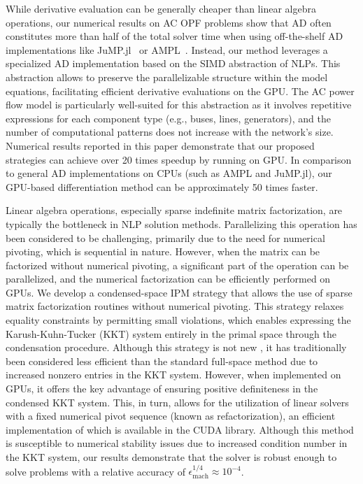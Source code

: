 While derivative evaluation can be generally cheaper than linear
algebra operations, our numerical results on AC OPF problems show that
AD often constitutes more than half of the total solver time when
using off-the-shelf AD implementations like
JuMP.jl~\cite{dunning2017jump} or
AMPL~\cite{fourer1990modeling}. Instead, our method leverages a
specialized AD implementation based on the SIMD abstraction of
NLPs. This abstraction allows to preserve the parallelizable structure
within the model equations, facilitating efficient derivative
evaluations on the GPU. The AC power flow model is particularly
well-suited for this abstraction as it involves repetitive expressions
for each component type (e.g., buses, lines, generators), and the
number of computational patterns does not increase with the network's
size. Numerical results reported in this paper demonstrate that our
proposed strategies can achieve over 20 times speedup by running on
GPU. In comparison to general AD implementations on CPUs (such as AMPL
and JuMP.jl), our GPU-based  differentiation method can be approximately 50 times faster.

Linear algebra operations, especially sparse indefinite matrix
factorization, are typically the bottleneck in NLP solution methods.
Parallelizing this operation has been considered to be challenging,
primarily due to the need for numerical pivoting, which is sequential
in nature. However, when the matrix can be factorized without
numerical pivoting, a significant part of the operation can be
parallelized, and the numerical factorization can be efficiently
performed on GPUs. We develop a condensed-space IPM strategy that
allows the use of sparse matrix factorization routines without
numerical pivoting. This strategy relaxes equality constraints by
permitting small violations, which enables expressing the
Karush-Kuhn-Tucker (KKT) system entirely in the primal space through
the condensation procedure. Although this strategy is not new
\cite{nocedal2006numerical}, it has traditionally been considered less
efficient than the standard full-space method due to increased nonzero
entries in the KKT system. However, when implemented on GPUs, it
offers the key advantage of ensuring positive definiteness in the
condensed KKT system. This, in turn, allows for the utilization
of linear solvers with a fixed numerical pivot sequence (known as
refactorization), an efficient implementation of which is available in the CUDA library.
Although this method is susceptible to numerical stability issues due to
increased condition number in the KKT system, our results demonstrate
that the solver is robust enough to solve problems with a relative
accuracy of $\epsilon_{\text{mach}}^{1/4}\approx 10^{-4}$.

